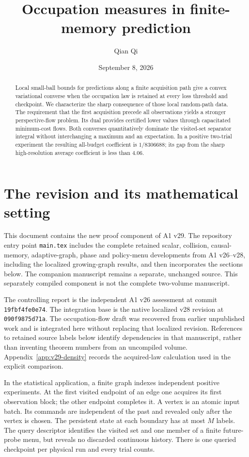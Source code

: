 \documentclass[11pt]{amsart}
\title[Occupation measures and finite-memory prediction]{Occupation measures in finite-memory prediction}
\author{Qian Qi}
\date{September 8, 2026}
\theoremstyle{definition}\newtheorem{definition}[theorem]{Definition}
\theoremstyle{remark}\newtheorem{remark}[theorem]{Remark}
\begin{document}
\begin{abstract}
Local small-ball bounds for predictions along a finite acquisition path give a convex variational converse when the occupation law is retained at every loss threshold and checkpoint. We characterize the sharp consequence of those local random-path data. The requirement that the first acquisition precede all observations yields a stronger perspective-flow problem. Its dual provides certified lower values through capacitated minimum-cost flows. Both converses quantitatively dominate the visited-set separator integral without interchanging a maximum and an expectation. In a positive two-trial experiment the resulting all-budget coefficient is $1/8306688$; its gap from the sharp high-resolution average coefficient is less than $4.06$.
\end{abstract}
\maketitle

\section{The revision and its mathematical setting}
This document contains the new proof component of A1 v29. The repository entry point \texttt{main.tex} includes the complete retained scalar, collision, causal-memory, adaptive-graph, phase and policy-menu developments from A1 v26--v28, including the localized growing-graph results, and then incorporates the sections below. The companion manuscript remains a separate, unchanged source. This separately compiled component is not the complete two-volume manuscript.

The controlling report is the independent A1 v26 assessment at commit \texttt{19fbf4fe0e74}. The integration base is the native localized v28 revision at \texttt{090f9875d71a}. The occupation-flow draft was recovered from earlier unpublished work and is integrated here without replacing that localized revision. References to retained source labels below identify dependencies in that manuscript, rather than inventing theorem numbers from an uncompiled volume. Appendix~\ref{app:v29-density} records the acquired-law calculation used in the explicit comparison.

In the statistical application, a finite graph indexes independent positive experiments. At the first visited endpoint of an edge one acquires its first observation block; the other endpoint completes it. A vertex is an atomic input batch. Its commands are independent of the past and revealed only after the vertex is chosen. The persistent state at each boundary has at most $M$ labels. The query descriptor identifies the visited set and one member of a finite future-probe menu, but reveals no discarded continuous history. There is one queried checkpoint per physical run and every trial counts.
\end{document}
